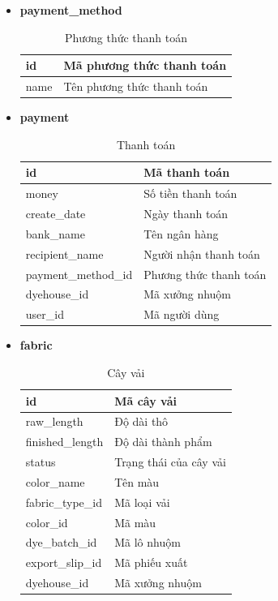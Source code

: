 \begin{itemize}
    \item \textbf{payment\_method}
    \begin{table}[H]
        \centering
        \begin{tabular}{|m{3cm}|m{10cm}|}
        \hline 
            id & Mã phương thức thanh toán\\ \hline
            name & Tên phương thức thanh toán\\ 
        \hline 
        \end{tabular}
        \caption{Phương thức thanh toán}
        \label{payment_method}
    \end{table}
    
    \item \textbf{payment}
    \begin{table}[H]
        \centering
        \begin{tabular}{|m{3.5cm}|m{10cm}|}
        \hline 
            id & Mã thanh toán\\ \hline
            money & Số tiền thanh toán\\ \hline
            create\_date & Ngày thanh toán \\ \hline
            bank\_name & Tên ngân hàng\\ \hline
            recipient\_name & Người nhận thanh toán\\ \hline
            payment\_method\_id & Phương thức thanh toán \\ \hline
            dyehouse\_id & Mã xưởng nhuộm\\ \hline
            user\_id & Mã người dùng\\ 
        \hline 
        \end{tabular}
        \caption{Thanh toán}
        \label{payment}
    \end{table}
    
    \item \textbf{fabric}
    \begin{table}[H]
        \centering
        \begin{tabular}{|m{3cm}|m{10cm}|}
        \hline 
            id & Mã cây vải\\ \hline
            raw\_length & Độ dài thô\\ \hline
            finished\_length & Độ dài thành phẩm \\ \hline
            status & Trạng thái của cây vải\\ \hline
            color\_name & Tên màu\\ \hline
            fabric\_type\_id & Mã loại vải\\ \hline
            color\_id & Mã màu \\ \hline
            dye\_batch\_id & Mã lô nhuộm\\ \hline
            export\_slip\_id & Mã phiếu xuất\\ \hline
            dyehouse\_id & Mã xưởng nhuộm\\ 
        \hline 
        \end{tabular}
        \caption{Cây vải}
        \label{fabric}
    \end{table}


\end{itemize}
